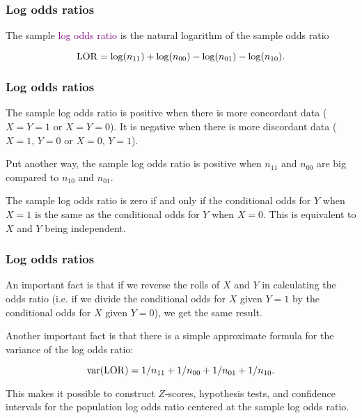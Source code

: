\documentclass{beamer}
\begin{document}
\begin{frame}
\frametitle{Log odds ratios}

The sample \textcolor{purple}{log odds ratio} is the natural logarithm
of the sample odds ratio

$$
{\rm LOR} = \log(n_{11}) + \log(n_{00}) - \log(n_{01}) - \log(n_{10}).
$$

\end{frame}

\begin{frame}
\frametitle{Log odds ratios}

The sample log odds ratio is positive when there is more concordant
data ($X=Y=1$ or $X=Y=0$).  It is negative when there is more
discordant data ($X=1$, $Y=0$ or $X=0$, $Y=1$).

Put another way, the sample log odds ratio is positive when $n_{11}$
and $n_{00}$ are big compared to $n_{10}$ and $n_{01}$.

The sample log odds ratio is zero if and only if the conditional odds
for $Y$ when $X=1$ is the same as the conditional odds for $Y$ when
$X=0$.  This is equivalent to $X$ and $Y$ being independent.

\end{frame}



\begin{frame}
\frametitle{Log odds ratios}

An important fact is that if we reverse the rolls of $X$ and $Y$ in
calculating the odds ratio (i.e. if we divide the conditional odds for
$X$ given $Y=1$ by the conditional odds for $X$ given $Y=0$), we get
the same result.

Another important fact is that there is a simple approximate formula
for the variance of the log odds ratio:

$$
{\rm var}({\rm LOR}) = 1/n_{11} + 1/n_{00} + 1/n_{01} + 1/n_{10}.
$$

This makes it possible to construct $Z$-scores, hypothesis tests, and
confidence intervals for the population log odds ratio centered at the
sample log odds ratio.

\end{frame}
\end{document}
